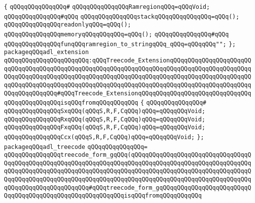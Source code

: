 \verb|{|\newline
\verb|qQQqqQQqqQQqqQQq#|\newline
\verb|qQQqqQQqqQQqqQQqRamregionqQQq=qQQqVoid;|\newline
\verb|qQQqqQQqqQQqqQQq#qQQq|\newline
\verb|qQQqqQQqqQQqqQQqstackqQQqqQQqqQQqqQQq=qQQq();|\newline
\verb|qQQqqQQqqQQqqQQqreadonlyqQQq=qQQq();|\newline
\verb|qQQqqQQqqQQqqQQqmemoryqQQqqQQqqQQq=qQQq();|\newline
\verb|qQQqqQQqqQQqqQQq#qQQq|\newline
\verb|qQQqqQQqqQQqqQQqfunqQQqramregion_to_stringqQQq_qQQq=qQQqqQQq"";|\newline
\verb|};|\newline
\newline
\verb|packageqQQqadl_extension|\newline
\verb|qQQqqQQqqQQqqQQqqQQqqQQq:qQQqTreecode_ExtensionqQQqqQQqqQQqqQQqqQQqqQQqqQQqqQQqqQQqqQQqqQQqqQQqqQQqqQQqqQQqqQQqqQQqqQQqqQQqqQQqqQQqqQQqqQQqqQQqqQQqqQQqqQQqqQQqqQQqqQQqqQQqqQQqqQQqqQQqqQQqqQQqqQQqqQQqqQQqqQQqqQQqqQQqqQQqqQQqqQQqqQQqqQQqqQQqqQQqqQQqqQQqqQQqqQQqqQQqqQQqqQQqqQQqqQQqqQQqqQQqqQQqqQQq#qQQqTreecode_ExtensionqQQqqQQqqQQqqQQqqQQqqQQqqQQqqQQqqQQqqQQqqQQqqQQqisqQQqfromqQQqqQQqqQQq|\newline
\verb|{|\newline
\verb|qQQqqQQqqQQqqQQq#|\newline
\verb|qQQqqQQqqQQqqQQqSxqQQq(qQQqS,R,F,CqQQq)qQQq=qQQqqQQqVoid;|\newline
\verb|qQQqqQQqqQQqqQQqRxqQQq(qQQqS,R,F,CqQQq)qQQq=qQQqqQQqVoid;|\newline
\verb|qQQqqQQqqQQqqQQqFxqQQq(qQQqS,R,F,CqQQq)qQQq=qQQqqQQqVoid;|\newline
\verb|qQQqqQQqqQQqqQQqCcx(qQQqS,R,F,CqQQq)qQQq=qQQqqQQqVoid;|\newline
\verb|};|\newline
\newline
\verb|packageqQQqadl_treecode|\newline
\verb|qQQqqQQqqQQqqQQq=|\newline
\verb|qQQqqQQqqQQqqQQqtreecode_form_gqQQq(qQQqqQQqqQQqqQQqqQQqqQQqqQQqqQQqqQQqqQQqqQQqqQQqqQQqqQQqqQQqqQQqqQQqqQQqqQQqqQQqqQQqqQQqqQQqqQQqqQQqqQQqqQQqqQQqqQQqqQQqqQQqqQQqqQQqqQQqqQQqqQQqqQQqqQQqqQQqqQQqqQQqqQQqqQQqqQQqqQQqqQQqqQQqqQQqqQQqqQQqqQQqqQQqqQQqqQQqqQQqqQQqqQQqqQQqqQQqqQQqqQQqqQQqqQQqqQQqqQQqqQQqqQQq#qQQqtreecode_form_gqQQqqQQqqQQqqQQqqQQqqQQqqQQqqQQqqQQqqQQqqQQqqQQqqQQqqQQqqQQqisqQQqfromqQQqqQQqqQQq|\newline
